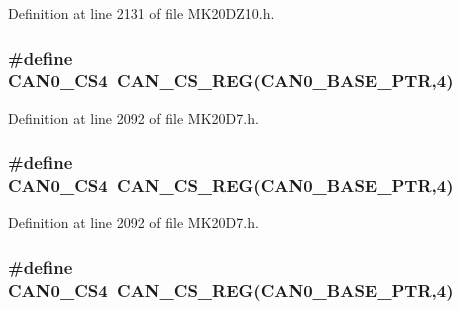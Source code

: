 Definition at line 2131 of file M\+K20\+D\+Z10.\+h.

\subsubsection[{\texorpdfstring{C\+A\+N0\+\_\+\+C\+S4}{CAN0_CS4}}]{\setlength{\rightskip}{0pt plus 5cm}\#define C\+A\+N0\+\_\+\+C\+S4~{\bf C\+A\+N\+\_\+\+C\+S\+\_\+\+R\+EG}({\bf C\+A\+N0\+\_\+\+B\+A\+S\+E\+\_\+\+P\+TR},4)}\hypertarget{group___c_a_n___register___accessor___macros_ga21ee2d67c838fa0427eba2f87844a048}{}\label{group___c_a_n___register___accessor___macros_ga21ee2d67c838fa0427eba2f87844a048}


Definition at line 2092 of file M\+K20\+D7.\+h.

\subsubsection[{\texorpdfstring{C\+A\+N0\+\_\+\+C\+S4}{CAN0_CS4}}]{\setlength{\rightskip}{0pt plus 5cm}\#define C\+A\+N0\+\_\+\+C\+S4~{\bf C\+A\+N\+\_\+\+C\+S\+\_\+\+R\+EG}({\bf C\+A\+N0\+\_\+\+B\+A\+S\+E\+\_\+\+P\+TR},4)}\hypertarget{group___c_a_n___register___accessor___macros_ga21ee2d67c838fa0427eba2f87844a048}{}\label{group___c_a_n___register___accessor___macros_ga21ee2d67c838fa0427eba2f87844a048}


Definition at line 2092 of file M\+K20\+D7.\+h.

\subsubsection[{\texorpdfstring{C\+A\+N0\+\_\+\+C\+S4}{CAN0_CS4}}]{\setlength{\rightskip}{0pt plus 5cm}\#define C\+A\+N0\+\_\+\+C\+S4~{\bf C\+A\+N\+\_\+\+C\+S\+\_\+\+R\+EG}({\bf C\+A\+N0\+\_\+\+B\+A\+S\+E\+\_\+\+P\+TR},4)}\hypertarget{group___c_a_n___register___accessor___macros_ga21ee2d67c838fa0427eba2f87844a048}{}\label{group___c_a_n___register___accessor___macros_ga21ee2d67c838fa0427eba2f87844a048}


